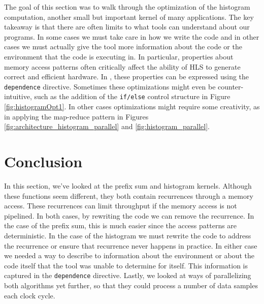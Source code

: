 The goal of this section was to walk through the optimization of the histogram computation, another small but important kernel of many applications. The key takeaway is that there are often limits to what tools can understand about our programs.  In some cases we must take care in how we write the code and in other cases we must actually give the tool more information about the code or the environment that the code is executing in.  In particular, properties about memory access patterns often critically affect the ability of HLS to generate correct and efficient hardware.  In \VHLS, these properties can be expressed using the \lstinline|dependence| directive.  Sometimes these optimizations might even be counter-intuitive, such as the addition of the \lstinline{if/else} control structure in Figure \ref{fig:histogramOpt1}.  In other cases optimizations might require some creativity, as in applying the map-reduce pattern in Figures \ref{fig:architecture_histogram_parallel} and \ref{fig:histogram_parallel}.  

\section{Conclusion}
In this section, we've looked at the prefix sum and histogram kernels.  Although these functions seem different, they both contain recurrences through a memory access.  These recurrences can limit throughput if the memory access is not pipelined.  In both cases, by rewriting the code we can remove the recurrence.  In the case of the prefix sum, this is much easier since the access patterns are deterministic.  In the case of the histogram we must rewrite the code to address the recurrence or ensure that recurrence never happens in practice.   In either case we needed a way to describe to \VHLS information about the environment or about the code itself that the tool was unable to determine for itself.  This information is captured in the \lstinline{dependence} directive.  Lastly, we looked at ways of parallelizing both algorithms yet further, so that they could process a number of data samples each clock cycle.